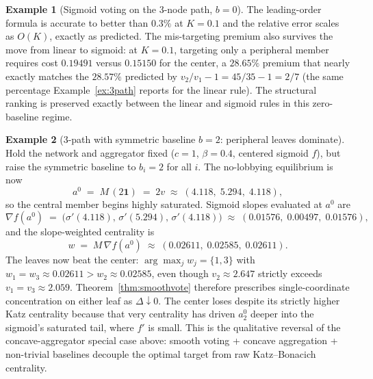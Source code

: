 \documentclass[11pt,letterpaper]{article}
\theoremstyle{plain}
\theoremstyle{definition}
\newtheorem{example}{Example}
\theoremstyle{remark}
\begin{document}
\begin{example}[Sigmoid voting on the 3-node path, $b = 0$]
The leading-order formula is accurate to better than $0.3\%$ at $K = 0.1$ and the relative error scales as $O(K)$, exactly as predicted. The mis-targeting premium also survives the move from linear to sigmoid: at $K = 0.1$, targeting only a peripheral member requires cost $0.19491$ versus $0.15150$ for the center, a $28.65\%$ premium that nearly exactly matches the $28.57\%$ predicted by $v_2/v_1 - 1 = 45/35 - 1 = 2/7$ (the same percentage Example~\ref{ex:3path} reports for the linear rule). The structural ranking is preserved exactly between the linear and sigmoid rules in this zero-baseline regime.
\end{example}

\begin{example}[3-path with symmetric baseline $b = 2$: peripheral leaves dominate]\label{ex:smooth_flip}
Hold the network and aggregator fixed ($c = 1$, $\beta = 0.4$, centered sigmoid $f$), but raise the symmetric baseline to $b_i = 2$ for all $i$. The no-lobbying equilibrium is now
\[
a^0 \;=\; M\,(2\mathbf{1}) \;=\; 2 v \;\approx\; (4.118,\; 5.294,\; 4.118),
\]
so the central member begins highly saturated. Sigmoid slopes evaluated at $a^0$ are
\[
\nabla f(a^0) \;=\; \bigl(\sigma'(4.118),\, \sigma'(5.294),\, \sigma'(4.118)\bigr) \;\approx\; (0.01576,\; 0.00497,\; 0.01576),
\]
and the slope-weighted centrality is
\[
w \;=\; M\, \nabla f(a^0) \;\approx\; (0.02611,\; 0.02585,\; 0.02611).
\]
The leaves now beat the center: $\arg\max_j w_j = \{1, 3\}$ with $w_1 = w_3 \approx 0.02611 > w_2 \approx 0.02585$, even though $v_2 \approx 2.647$ strictly exceeds $v_1 = v_3 \approx 2.059$. Theorem~\ref{thm:smoothvote} therefore prescribes single-coordinate concentration on either leaf as $\Delta \downarrow 0$. The center loses despite its strictly higher Katz centrality because that very centrality has driven $a^0_2$ deeper into the sigmoid's saturated tail, where $f'$ is small. This is the qualitative reversal of the concave-aggregator special case above: smooth voting + concave aggregation + non-trivial baselines decouple the optimal target from raw Katz--Bonacich centrality.
\end{example}
\end{document}
